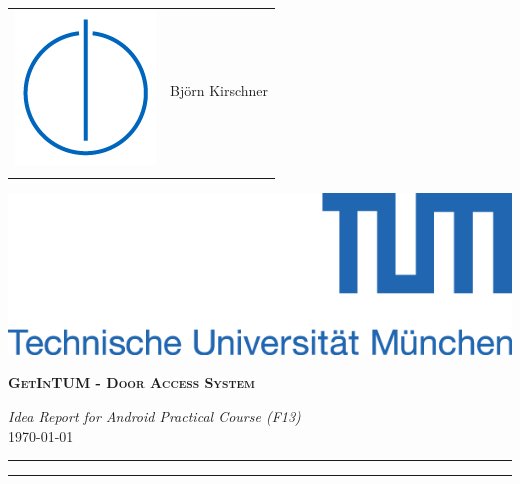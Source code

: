 \documentclass[a4paper,12pt]{article}
\begin{document}
\noindent %
\begin{minipage}{0.5\textwidth}
\begin{flushleft}
	\begin{tabular}{lm{6cm}}
	\multirow{5}{*}{\includegraphics[scale=1]{images/IN_logo.png}} \\
	 &  \\
	 & Bj\"{o}rn Kirschner \\
	 &  \\
	 & \\
	 & \\
	\end{tabular}
\end{flushleft}
\end{minipage}
\hfill
\begin{minipage}{0.5\textwidth}
\begin{flushright}
	\includegraphics[scale=1]{images/tum_logo.png}
\end{flushright}
\end{minipage}

\begin{center}
{\LARGE\textbf{\textsc{GetInTUM - Door Access System}}}

\large \textit{Idea Report for Android Practical Course (F13)} \\
\large \today
\end{center}

\bigskip
\bigskip

\hrule
\bigskip
\bigskip

\newpage
\bigskip
\tableofcontents

\bigskip
\bigskip
\bigskip
\hrule










\end{document}
